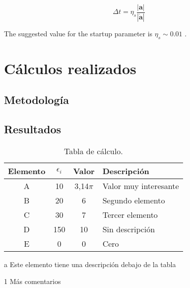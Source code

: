 \begin{appendixs}
	\begin{equation}
		\Delta t = \eta_s \frac{|\mathbf{a}|}{|\dot{\mathbf{a}}|}
	\end{equation}
	
	The suggested value for the startup parameter is $\eta_s \sim 0.01$ \cite{makino1992}.
	
	\section{Cálculos realizados}

	\subsection{Metodología}
	\lipsum[1-2]


	\subsection{Resultados}
	\lipsum[10]

	\enabletablerowcolor[2] %
	\begin{table}[H]
		\begin{threeparttable}
		\centering
		\caption{Tabla de cálculo.}
		\begin{tabular}{cccC{4cm}}
			\hline
			\textbf{Elemento} & $\epsilon_i$ & \textbf{Valor} & \textbf{Descripción} \bigstrut \\
			\hline
			A     & 10    & 3,14$\pi$ & Valor muy interesante \\
			B     & 20    & 6 & Segundo elemento \\
			C     & 30    & 7 & Tercer elemento \\
			D     & 150    & 10 & Sin descripción \\
			E     & 0    & 0 & Cero \\
			\hline
			\end{tabular}
		\begin{tablenotes}
			\item[a] Este elemento tiene una descripción debajo de la tabla
			\item[1] Más comentarios
		\end{tablenotes}
		\end{threeparttable}
		\label{tab:anexo-1}
	\end{table}
	\disabletablerowcolor %

\end{appendixs}
